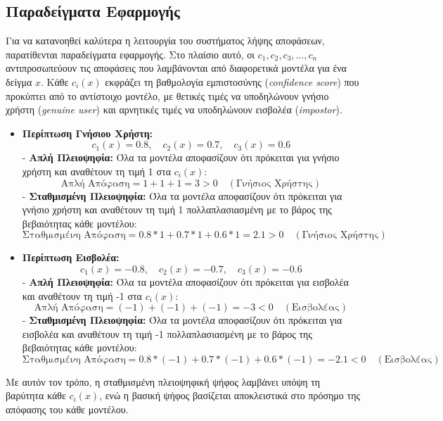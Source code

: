 \subsection{Παραδείγματα Εφαρμογής}

Για να κατανοηθεί καλύτερα η λειτουργία του συστήματος λήψης αποφάσεων, παρατίθενται παραδείγματα εφαρμογής. Στο πλαίσιο αυτό, οι \(c_1, c_2, c_3, \ldots, c_n\) αντιπροσωπεύουν τις αποφάσεις που λαμβάνονται από διαφορετικά μοντέλα για ένα δείγμα \(x\). Κάθε \(c_i(x)\) εκφράζει τη βαθμολογία εμπιστοσύνης (\textit{confidence score}) που προκύπτει από το αντίστοιχο μοντέλο, με θετικές τιμές να υποδηλώνουν γνήσιο χρήστη (\textit{genuine user}) και αρνητικές τιμές να υποδηλώνουν εισβολέα (\textit{impostor}).

\begin{itemize}
    \item \textbf{Περίπτωση Γνήσιου Χρήστη:} 
    \[
    c_1(x) = 0.8, \quad c_2(x) = 0.7, \quad c_3(x) = 0.6
    \]
    - \textbf{Απλή Πλειοψηφία:} Όλα τα μοντέλα αποφασίζουν ότι πρόκειται για γνήσιο χρήστη και αναθέτουν τη τιμή 1 στα \(c_i(x)\):
      \[
      \text{Απλή Απόφαση} = 1 + 1 + 1 = 3 > 0 \quad (\text{Γνήσιος Χρήστης})
      \]
    - \textbf{Σταθμισμένη Πλειοψηφία:} Όλα τα μοντέλα αποφασίζουν ότι πρόκειται για γνήσιο χρήστη και αναθέτουν τη τιμή 1 πολλαπλασιασμένη με το βάρος της βεβαιότητας κάθε μοντέλου:
      \[
      \text{Σταθμισμένη Απόφαση} = 0.8 * 1 + 0.7 * 1 + 0.6 * 1 = 2.1 > 0 \quad (\text{Γνήσιος Χρήστης})
      \]
    
    \item \textbf{Περίπτωση Εισβολέα:} 
    \[
    c_1(x) = -0.8, \quad c_2(x) = -0.7, \quad c_3(x) = -0.6
    \]
    - \textbf{Απλή Πλειοψηφία:} Όλα τα μοντέλα αποφασίζουν ότι πρόκειται για εισβολέα και αναθέτουν τη τιμή -1 στα \(c_i(x)\):
      \[
      \text{Απλή Απόφαση} = (-1) + (-1) + (-1) = -3 < 0 \quad (\text{Εισβολέας})
      \]
    - \textbf{Σταθμισμένη Πλειοψηφία:} Όλα τα μοντέλα αποφασίζουν ότι πρόκειται για εισβολέα και αναθέτουν τη τιμή -1 πολλαπλασιασμένη με το βάρος της βεβαιότητας κάθε μοντέλου:
      \[
      \text{Σταθμισμένη Απόφαση} = 0.8 * (-1) + 0.7 * (-1) + 0.6 * (-1) = -2.1 < 0 \quad (\text{Εισβολέας})
      \]
    
    \end{itemize}

Με αυτόν τον τρόπο, η σταθμισμένη πλειοψηφική ψήφος λαμβάνει υπόψη τη βαρύτητα κάθε \(c_i(x)\), ενώ η βασική ψήφος βασίζεται αποκλειστικά στο πρόσημο της απόφασης του κάθε μοντέλου.
